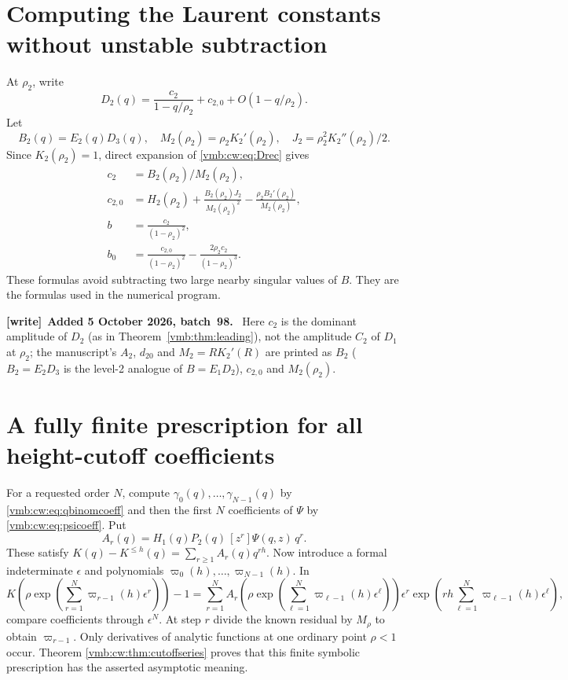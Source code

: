 \documentclass[11pt,a4paper]{article}
\numberwithin{equation}{section}
\theoremstyle{definition}\newtheorem{definition}[theorem]{Definition}
\theoremstyle{remark}\newtheorem{remark}[theorem]{Remark}
\newenvironment{writenote}[1][]{\par\smallskip\begingroup\small
 \noindent\textbf{[write]}\if\relax\detokenize{#1}\relax\else~\textbf{#1.}\fi\ }%
 {\par\endgroup\smallskip}
\begin{document}
\section{Computing the Laurent constants without unstable subtraction}
\label{vmb:cw:app:laurent}
At $\rho_2$, write
\[
 D_2(q)=\frac{c_2}{1-q/\rho_2}+c_{2,0}+O(1-q/\rho_2).
\]
Let
\[
 B_2(q)=E_2(q)D_3(q),\quad
 M_2(\rho_2)=\rho_2K_2'(\rho_2),\quad J_2=\rho_2^2K_2''(\rho_2)/2.
\]
Since $K_2(\rho_2)=1$, direct expansion of \eqref{vmb:cw:eq:Drec} gives
\begin{align}
 c_2&=B_2(\rho_2)/M_2(\rho_2),\\
 c_{2,0}&=H_2(\rho_2)+\frac{B_2(\rho_2)J_2}{M_2(\rho_2)^2}-\frac{\rho_2B_2'(\rho_2)}{M_2(\rho_2)},\\
 b&=\frac{c_2}{(1-\rho_2)^2},\\
 b_0&=\frac{c_{2,0}}{(1-\rho_2)^2}-\frac{2\rho_2c_2}{(1-\rho_2)^3}.
\end{align}
These formulas avoid subtracting two large nearby singular values of $B$.
They are the formulas used in the numerical program.

\begin{writenote}[Added 5 October 2026, batch~98]
Here $c_2$ is the dominant amplitude of $D_2$ (as in
Theorem~\ref{vmb:thm:leading}), not the amplitude $C_2$ of $D_1$ at $\rho_2$;
the manuscript's $A_2$, $d_{20}$ and $M_2=RK_2'(R)$ are printed as $B_2$
($B_2=E_2D_3$ is the level-2 analogue of $B=E_1D_2$), $c_{2,0}$ and
$M_2(\rho_2)$.
\end{writenote}

\section{A fully finite prescription for all height-cutoff coefficients}
\label{vmb:cw:app:cutoff}
For a requested order $N$, compute $\gamma_0(q),\ldots,\gamma_{N-1}(q)$ by
\eqref{vmb:cw:eq:qbinomcoeff} and then the first $N$ coefficients of $\Psi$ by
\eqref{vmb:cw:eq:psicoeff}. Put
\[
 A_r(q)=H_1(q)P_2(q)\,[z^r]\Psi(q,z)\,q^r.
\]
These satisfy $K(q)-K^{\le h}(q)=\sum_{r\ge1}A_r(q)q^{rh}$.
Now introduce a formal indeterminate $\epsilon$ and polynomials
$\varpi_0(h),\ldots,\varpi_{N-1}(h)$. In
\[
 K\!\left(\rho\exp\left(\sum_{r=1}^N\varpi_{r-1}(h)\epsilon^r\right)\right)-1
 =\sum_{r=1}^N A_r\!\left(\rho\exp\left(\sum_{\ell=1}^N
              \varpi_{\ell-1}(h)\epsilon^\ell\right)\right)
 \epsilon^r\exp\left(rh\sum_{\ell=1}^N\varpi_{\ell-1}(h)\epsilon^\ell\right),
\]
compare coefficients through $\epsilon^N$. At step $r$ divide the known
residual by $M_\rho$ to obtain $\varpi_{r-1}$. Only derivatives of analytic
functions at one ordinary point $\rho<1$ occur. Theorem
\ref{vmb:cw:thm:cutoffseries} proves that this finite symbolic prescription has
the asserted asymptotic meaning.
\end{document}
